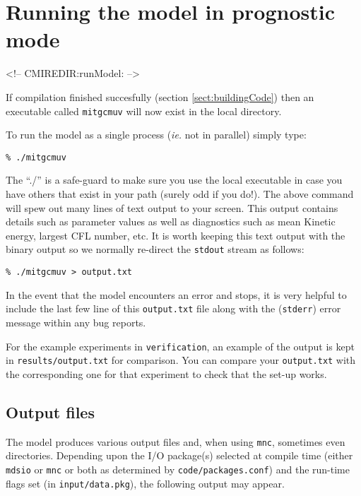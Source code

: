 \section[Running MITgcm]{Running the model in prognostic mode}
\label{sect:runModel}
\begin{rawhtml}
<!-- CMIREDIR:runModel: -->
\end{rawhtml}

If compilation finished succesfully (section \ref{sect:buildingCode})
then an executable called \texttt{mitgcmuv} will now exist in the
local directory.

To run the model as a single process (\textit{ie.} not in parallel)
simply type:
\begin{verbatim}
% ./mitgcmuv
\end{verbatim}
The ``./'' is a safe-guard to make sure you use the local executable
in case you have others that exist in your path (surely odd if you
do!). The above command will spew out many lines of text output to
your screen.  This output contains details such as parameter values as
well as diagnostics such as mean Kinetic energy, largest CFL number,
etc. It is worth keeping this text output with the binary output so we
normally re-direct the \texttt{stdout} stream as follows:
\begin{verbatim}
% ./mitgcmuv > output.txt
\end{verbatim}
In the event that the model encounters an error and stops, it is very
helpful to include the last few line of this \texttt{output.txt} file
along with the (\texttt{stderr}) error message within any bug reports.

For the example experiments in \texttt{verification}, an example of the
output is kept in \texttt{results/output.txt} for comparison. You can
compare your \texttt{output.txt} with the corresponding one for that
experiment to check that the set-up works.



\subsection{Output files}

The model produces various output files and, when using \texttt{mnc},
sometimes even directories.  Depending upon the I/O package(s)
selected at compile time (either \texttt{mdsio} or \texttt{mnc} or
both as determined by \texttt{code/packages.conf}) and the run-time
flags set (in \texttt{input/data.pkg}), the following output may
appear.


